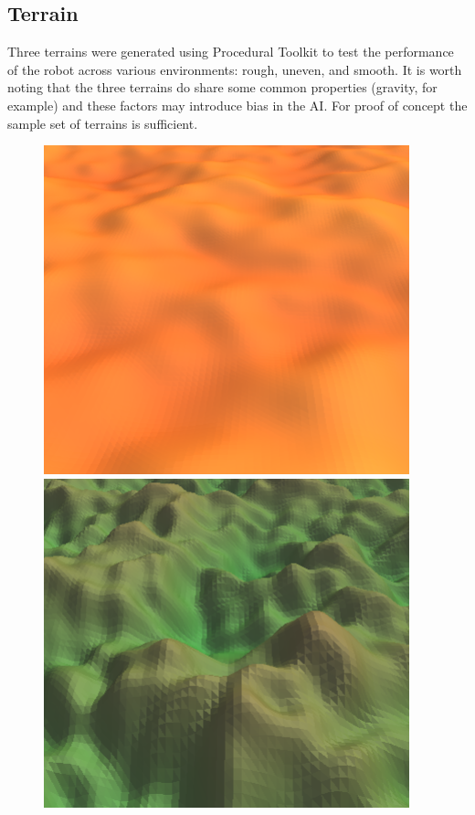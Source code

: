 \documentclass{article}
\begin{document}
\subsection{Terrain}
\label{sec:Terrain Imp}
Three terrains were generated using Procedural Toolkit  to test the performance of the robot across various environments: rough, uneven, and smooth. It is worth noting that the three terrains do share some common properties (gravity, for example) and these factors may introduce bias in the AI. For proof of concept the sample set of terrains is sufficient.\\
\begin{figure}[H]
\centering
\includegraphics[scale=0.3]{smoothTerrain}
\includegraphics[scale=0.3]{unevenTerrain}

\end{figure}
\end{document}
